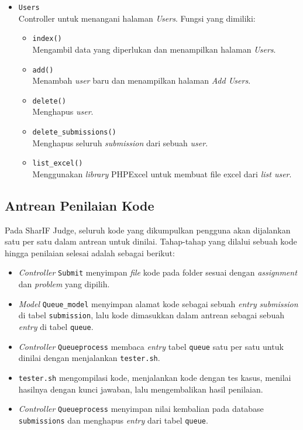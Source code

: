 \begin{itemize}
	\item \verb|Users| \\ Controller untuk menangani halaman \textit{Users}. Fungsi yang dimiliki:
	\begin{itemize}
        \item \verb|index()| \\ Mengambil data yang diperlukan dan menampilkan halaman \textit{Users}.
        \item \verb|add()| \\ Menambah \textit{user} baru dan menampilkan halaman \textit{Add Users}.
        \item \verb|delete()| \\ Menghapus \textit{user}.
        \item \verb|delete_submissions()| \\ Menghapus seluruh \textit{submission} dari sebuah \textit{user}.
         \item \verb|list_excel()| \\ Menggunakan \textit{library} PHPExcel untuk membuat file excel dari \textit{list user}.
	\end{itemize}
\end{itemize}

\subsection{Antrean Penilaian Kode}
\label{subsec:3:antrean} 
Pada SharIF Judge, seluruh kode yang dikumpulkan pengguna akan dijalankan satu per satu dalam antrean untuk dinilai. Tahap-tahap yang dilalui sebuah kode hingga penilaian selesai adalah sebagai berikut:

\begin{itemize}
    \item \textit{Controller} \verb|Submit| menyimpan \textit{file} kode pada folder sesuai dengan \textit{assignment} dan \textit{problem} yang dipilih.
    \item \textit{Model} \verb|Queue_model| menyimpan alamat kode sebagai sebuah \textit{entry} \textit{submission} di tabel \verb|submission|, lalu kode dimasukkan dalam antrean sebagai sebuah \textit{entry} di tabel \verb|queue|.
    \item \textit{Controller} \verb|Queueprocess| membaca \textit{entry} tabel \verb|queue| satu per satu untuk dinilai dengan menjalankan \verb|tester.sh|.
    \item \verb|tester.sh| mengompilasi kode, menjalankan kode dengan tes kasus, menilai hasilnya dengan kunci jawaban, lalu mengembalikan hasil penilaian.
    \item \textit{Controller} \verb|Queueprocess| menyimpan nilai kembalian pada database \verb|submissions| dan menghapus \textit{entry} dari tabel \verb|queue|.
\end{itemize}

